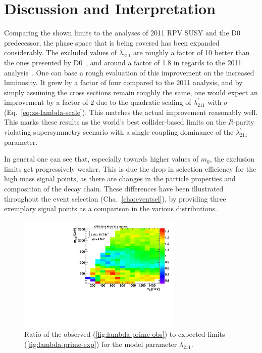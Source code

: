 \section{Discussion and Interpretation}
\label{sec:discussion}

Comparing the shown limits to the analyses of 2011 RPV SUSY and the D0 predecessor, the phase space that is being covered has been expanded considerably. The excluded values of $\lambda^{\prime}_{211}$ are roughly a factor of 10 better than the ones presented by D0~\cite{auter,d0rpv}, and around a factor of 1.8 in regards to the 2011 analysis~\cite{2011rpv}. One can base a rough evaluation of this improvement on the increased luminosity. It grew by a factor of four compared to the 2011 analysis, and by simply assuming the cross sections remain roughly the same, one would expect an improvement by a factor of 2 due to the quadratic scaling of $\lambda^\prime_{211}$ with $\sigma$ (Eq.~\ref{eq:xs-lambda-scale}). This matches the actual improvement reasonably well. This marks these results as the world's best collider-based limits on the $R$-parity violating supersymmetry scenario with a single coupling dominance of the $\lambda^{\prime}_{211}$ parameter.

In general one can see that, especially towards higher values of $m_0$, the exclusion limits get progressively weaker. This is due the drop in selection efficiency for the high mass signal points, as there are changes in the particle properties and composition of the decay chain. These differences have been illustrated throughout the event selection (Cha.~\ref{cha:eventsel}), by providing three exemplary signal points as a comparison in the various distributions.


\begin{figure}[!htb]
  \centering
  \includegraphics[width=0.7\textwidth]{plots/lambda_ratio.pdf}
  \caption{Ratio of the observed (\ref{fig:lambda-prime-obs}) to expected limits (\ref{fig:lambda-prime-exp}) for the model parameter $\lambda^{\prime}_{211}$.}
  \label{fig:lambda_ratio}
\end{figure}

